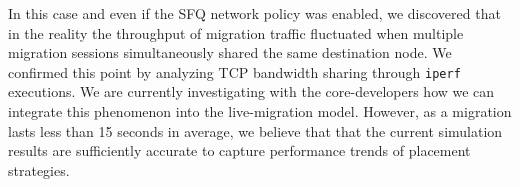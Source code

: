  In this case and even if the SFQ network policy was
enabled, we discovered that in the reality the throughput of migration
traffic fluctuated when multiple migration sessions simultaneously
shared the same destination node. We confirmed this point by analyzing
TCP bandwidth sharing through \texttt{iperf} executions. We are
currently investigating with the \sg core-developers how we can
integrate this phenomenon into the live-migration model. However, as a
migration lasts less than 15 seconds in average, we believe that that
the current simulation results are sufficiently accurate to capture
performance trends of placement strategies.






